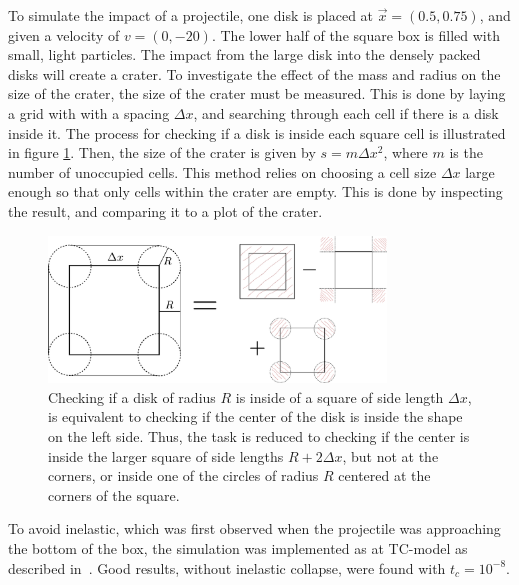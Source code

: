 \documentclass{article}
\begin{document}
            To simulate the impact of a projectile, one disk is placed at $\vec x = (0.5, 0.75)$, and given a velocity of $v = (0, -20)$. The lower half of the square box is filled with small, light particles. The impact from the large disk into the densely packed disks will create a crater. To investigate the effect of the mass and radius on the size of the crater, the size of the crater must be measured. This is done by laying a grid with with a spacing $\Delta x$, and searching through each cell if there is a disk inside it. The process for checking if a disk is inside each square cell is illustrated in figure \ref{cheack if disk is inside}. Then, the size of the crater is given by $s = m \Delta x^2$, where $m$ is the number of unoccupied cells. This method relies on choosing a cell size $\Delta x$ large enough so that only cells within the crater are empty. This is done by inspecting the result, and comparing it to a plot of the crater.

            \begin{figure}[ht]
                \centering
                \includegraphics[width=0.8\textwidth]{figure.pdf}
                \caption{Checking if a disk of radius $R$ is inside of a square of side length $\Delta x$, is equivalent to checking if the center of the disk is inside the shape on the left side. Thus, the task is reduced to checking if the center is inside the larger square of side lengths $R + 2 \Delta x$, but not at the corners, or inside one of the circles of radius $R$ centered at the corners of the square.}
                \label{cheack if disk is inside}
            \end{figure}

            To avoid inelastic, which was first observed when the projectile was approaching the bottom of the box, the simulation was implemented as at TC-model as described in~\cite{TC}. Good results, without inelastic collapse, were found with $t_c = 10^{-8}$.
\end{document}
